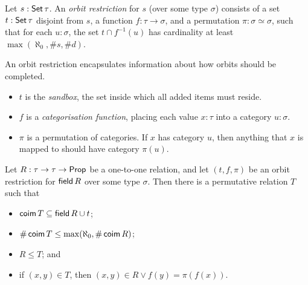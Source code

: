 \begin{definition}
  \label{def:OrbitRestriction}
  \leanok
  Let \( s : \operatorname{\mathsf{Set}} \tau \).
  An \emph{orbit restriction} for \( s \) (over some type \( \sigma \)) consists of a set \( t : \operatorname{\mathsf{Set}} \tau \) disjoint from \( s \), a function \( f : \tau \to \sigma \), and a permutation \( \pi : \sigma \simeq \sigma \), such that for each \( u : \sigma \), the set \( t \cap f^{-1}(u) \) has cardinality at least \( \max(\aleph_0, \#s, \#d) \).

  An orbit restriction encapsulates information about how orbits should be completed.
  \begin{itemize}
    \item \( t \) is the \emph{sandbox}, the set inside which all added items must reside.
    \item \( f \) is a \emph{categorisation function}, placing each value \( x : \tau \) into a category \( u : \sigma \).
    \item \( \pi \) is a permutation of categories. If \( x \) has category \( u \), then anything that \( x \) is mapped to should have category \( \pi(u) \).
  \end{itemize}
\end{definition}
\begin{proposition}
  \label{prop:completing_restricted_orbits}
  \leanok
  Let \( R : \tau \to \tau \to \mathsf{Prop} \) be a one-to-one relation, and let \( (t, f, \pi) \) be an orbit restriction for \( \operatorname{\mathsf{field}} R \) over some type \( \sigma \).
  Then there is a permutative relation \( T \) such that
  \begin{itemize}
    \item \( \operatorname{\mathsf{coim}} T \subseteq \operatorname{\mathsf{field}} R \cup t \);
    \item \( \#\operatorname{\mathsf{coim}} T \leq \max(\aleph_0, \#\operatorname{\mathsf{coim}} R) \);
    \item \( R \leq T \); and
    \item if \( (x, y) \in T \), then \( (x, y) \in R \vee f(y) = \pi(f(x)) \).
  \end{itemize}
\end{proposition}
